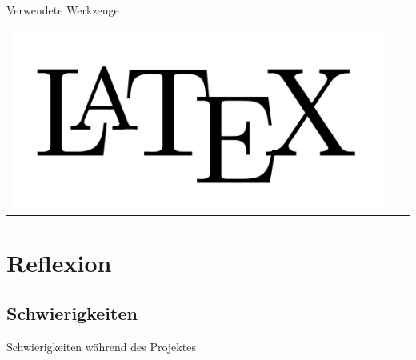 \documentclass[18pt]{beamer}
\begin{document}
\begin{frame}{Verwendete Werkzeuge}
\begin{tabular}{ccc}
		\includegraphics[width=0.3\linewidth, height=0.3\textheight, keepaspectratio]{bilder/latex.png}&
		\\
	\end{tabular}
	
\end{frame}

\section{Reflexion}
\subsection{Schwierigkeiten}
\begin{frame}{Schwierigkeiten während des Projektes}
\end{frame}
\end{document}

